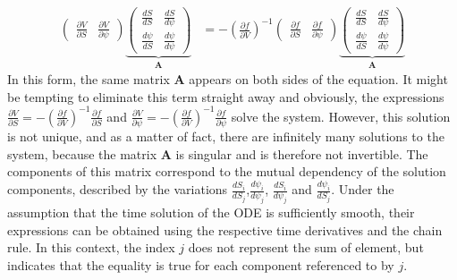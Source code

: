 \documentclass{report}
\begin{document}
\begin{align}
\label{eq:Jacobian_ODE_matrix_system}
\begin{pmatrix}
	\frac{\partial V}{\partial S} & \frac{\partial V}{\partial \psi}
\end{pmatrix} \underbrace{\begin{pmatrix}
                \frac{d S}{d S}  & \frac{dS}{d\psi}        \\
                \frac{d\psi}{dS} & \frac{d \psi}{d \psi} 
              \end{pmatrix}}_{\mathbf{A}}  &= -\left(\frac{\partial f}{\partial V}\right)^{-1}
              					\begin{pmatrix}
   									\frac{\partial f}{\partial S} & \frac{\partial f}{\partial \psi}
                                \end{pmatrix} \underbrace{\begin{pmatrix}
	                                \frac{d S}{d S}  & \frac{dS}{d\psi}        \\
	                                \frac{d\psi}{dS} & \frac{d \psi}{d \psi} 
                                \end{pmatrix}}_{\mathbf{A}}
\end{align}
In this form, the same matrix $\mathbf{A}$ appears on both sides of the equation. It might be tempting to eliminate this term straight away and obviously, the expressions $\frac{\partial V}{\partial S} = -\left(\frac{\partial f}{\partial V}\right)^{-1}\frac{\partial f}{\partial S}$ and $\frac{\partial V}{\partial \psi} = -\left(\frac{\partial f}{\partial V}\right)^{-1}\frac{\partial f}{\partial \psi}$ solve the system. However, this solution is not unique, and as a matter of fact, there are infinitely many solutions to the system, because the matrix $\mathbf{A}$ is singular and is therefore not invertible.
The components of this matrix correspond to the mutual dependency of the solution components, described by the variations $\frac{d S_i}{d S_j}$,$\frac{d \psi_i}{d \psi_j}$, $\frac{d S_i}{d \psi_j}$ and $\frac{d \psi_i}{d S_j}$. Under the assumption that the time solution of the ODE is sufficiently smooth, their expressions can be obtained using the respective time derivatives and the chain rule. In this context, the index $j$ does not represent the sum of element, but indicates that the equality is true for each component referenced to by $j$.   
\end{document}
